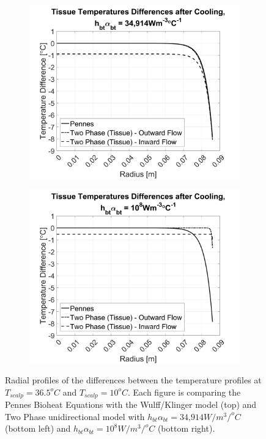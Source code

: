 \documentclass[11pt,english,a4paper,twoside,openright]{report}
\begin{document}
{{{{{{{{\begin{figure}[h]
	\begin{subfigure}[b]{0.49\textwidth}
		\includegraphics[width=\textwidth]{1DHemisphere/figure8}
	\end{subfigure}
	\begin{subfigure}[b]{0.49\textwidth}
		\includegraphics[width=\textwidth]{1DHemisphere/figure9}
	\end{subfigure}
	\caption[Radial profiles of the differences between the temperature profiles at $T_{scalp}=36.5^{o}C$ and $T_{scalp}=10^{o}C$]{Radial profiles of the differences between the temperature profiles at $T_{scalp}=36.5^{o}C$ and $T_{scalp}=10^{o}C$. Each figure is comparing the Pennes Bioheat Equations with the Wulff/Klinger model (top) and Two Phase unidirectional model with $h_{bt}\alpha_{bt} = \text{34,914}W/m^{3}/^{o}C$ (bottom left) and $h_{bt}\alpha_{bt} = 10^{8}W/m^{3}/^{o}C$ (bottom right).}
	\label{fig:Results4}
\end{figure}

}}}}}}}}
\end{document}
